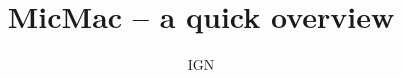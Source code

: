\documentclass{beamer}
\title{MicMac -- a quick overview}
\date{}
\author{IGN}
\begin{document}
\begin{frame}[plain]
\titlepage{}
\end{frame}

\tableofcontents


\end{document}
